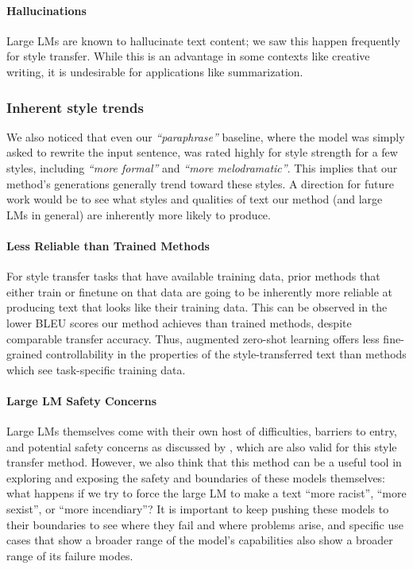 \paragraph{Hallucinations} Large LMs are known to hallucinate text content; we saw this happen frequently for style transfer. While this is an advantage in some contexts like creative writing, it is undesirable for applications like summarization. 
\subsubsection{Inherent style trends} We also noticed that even our \textit{``paraphrase''} baseline, where the model was simply asked to rewrite the input sentence, was rated highly for style strength for a few styles, including \textit{``more formal''} and \textit{``more melodramatic''}.
This implies that our method's generations generally trend toward these styles.
A direction for future work would be to see what styles and qualities of text our method (and large LMs in general) are inherently more likely to produce.

\paragraph{Less Reliable than Trained Methods}
For style transfer tasks that have available training data, prior methods that either train or finetune on that data are going to be inherently more reliable at producing text that looks like their training data.
This can be observed in the lower BLEU scores our method achieves than trained methods, despite comparable transfer accuracy.
Thus, augmented zero-shot learning offers less fine-grained controllability in the properties of the style-transferred text than methods which see task-specific training data.

\paragraph{Large LM Safety Concerns} Large LMs themselves come with their own host of difficulties, barriers to entry, and potential safety concerns as discussed by \citet{bender2021stochastic}, which are also valid for this style transfer method. However, we also think that this method can be a useful tool in exploring and exposing the safety and boundaries of these models themselves: what happens if we try to force the large LM to make a text ``more racist'', ``more sexist'', or ``more incendiary''? It is important to keep pushing these models to their boundaries to see where they fail and where problems arise, and specific use cases that show a broader range of the model's capabilities also show a broader range of its failure modes.


